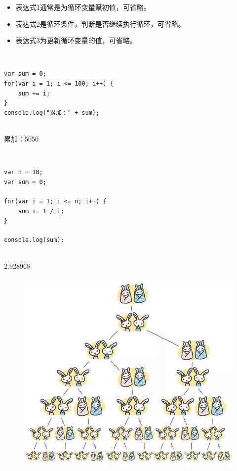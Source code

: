 \begin{itemize}
	\item 表达式1通常是为循环变量赋初值，可省略。
	\item 表达式2是循环条件，判断是否继续执行循环，可省略。
	\item 表达式3为更新循环变量的值，可省略。
\end{itemize}

 \\

\begin{lstlisting}[style=htmlcssjs]
var sum = 0;
for(var i = 1; i <= 100; i++) {
    sum += i;
}
console.log("累加：" + sum);
\end{lstlisting}

\begin{tcolorbox}
	 \\
	累加：5050
\end{tcolorbox}

 \\

\begin{lstlisting}[style=htmlcssjs]
var n = 10;
var sum = 0;

for(var i = 1; i <= n; i++) {
    sum += 1 / i;
}

console.log(sum);
\end{lstlisting}

\begin{tcolorbox}
	 \\
	2.928968
\end{tcolorbox}


\begin{figure}[H]
	\centering
	\includegraphics[scale=0.5]{img/C11/11-4/1.png}
\end{figure}

